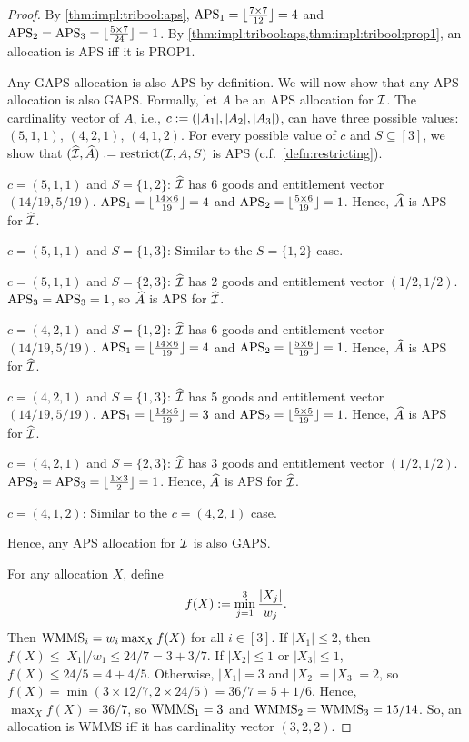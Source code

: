 \begin{proof}
By \cref{thm:impl:tribool:aps}, $\mathrm{APS}_1 = \lfloor \frac{7 \times 7}{12} \rfloor = 4$
and $\mathrm{APS}_2 = \mathrm{APS}_3 = \lfloor \frac{5 \times 7}{24} \rfloor = 1$.
By \cref{thm:impl:tribool:aps,thm:impl:tribool:prop1},
an allocation is APS iff it is PROP1.

Any GAPS allocation is also APS by definition.
We will now show that any APS allocation is also GAPS.
Formally, let $A$ be an APS allocation for $\mathcal{I}$.
The cardinality vector of $A$, i.e., $c := (|A_1|, |A_2|, |A_3|)$,
can have three possible values: $(5, 1, 1)$, $(4, 2, 1)$, $(4, 1, 2)$.
For every possible value of $c$ and $S \subseteq [3]$,
we show that $(\widehat{\mathcal{I}}, \widehat{A}) := \operatorname{restrict}(\mathcal{I}, A, S)$ is APS
(c.f.~\cref{defn:restricting}).
\begin{tightenum}
\item $c = (5, 1, 1)$ and $S = \{1, 2\}$:
    $\widehat{\mathcal{I}}$ has 6 goods and entitlement vector $(14/19, 5/19)$.
    $\mathrm{APS}_1 = \lfloor \frac{14 \times 6}{19} \rfloor = 4$ and $\mathrm{APS}_2 = \lfloor \frac{5 \times 6}{19} \rfloor = 1$.
    Hence, $\widehat{A}$ is APS for $\widehat{\mathcal{I}}$.
\item $c = (5, 1, 1)$ and $S = \{1, 3\}$:
    Similar to the $S = \{1, 2\}$ case.
\item $c = (5, 1, 1)$ and $S = \{2, 3\}$:
    $\widehat{\mathcal{I}}$ has 2 goods and entitlement vector $(1/2, 1/2)$.
    $\mathrm{APS}_3 = \mathrm{APS}_3 = 1$, so $\widehat{A}$ is APS for $\widehat{\mathcal{I}}$.
\item $c = (4, 2, 1)$ and $S = \{1, 2\}$:
    $\widehat{\mathcal{I}}$ has 6 goods and entitlement vector $(14/19, 5/19)$.
    $\mathrm{APS}_1 = \lfloor \frac{14 \times 6}{19} \rfloor = 4$ and $\mathrm{APS}_2 = \lfloor \frac{5 \times 6}{19} \rfloor = 1$.
    Hence, $\widehat{A}$ is APS for $\widehat{\mathcal{I}}$.
\item $c = (4, 2, 1)$ and $S = \{1, 3\}$:
    $\widehat{\mathcal{I}}$ has 5 goods and entitlement vector $(14/19, 5/19)$.
    $\mathrm{APS}_1 = \lfloor \frac{14 \times 5}{19} \rfloor = 3$ and $\mathrm{APS}_2 = \lfloor \frac{5 \times 5}{19} \rfloor = 1$.
    Hence, $\widehat{A}$ is APS for $\widehat{\mathcal{I}}$.
\item $c = (4, 2, 1)$ and $S = \{2, 3\}$:
    $\widehat{\mathcal{I}}$ has 3 goods and entitlement vector $(1/2, 1/2)$.
    $\mathrm{APS}_2 = \mathrm{APS}_3 = \lfloor \frac{1 \times 3}{2} \rfloor = 1$.
    Hence, $\widehat{A}$ is APS for $\widehat{\mathcal{I}}$.
\item $c = (4, 1, 2)$:
    Similar to the $c = (4, 2, 1)$ case.
\end{tightenum}
Hence, any APS allocation for $\mathcal{I}$ is also GAPS.

For any allocation $X$, define
\[ f(X) := \min_{j=1}^3 \frac{|X_j|}{w_j}. \]
Then $\mathrm{WMMS}_i = w_i\max_X f(X)$ for all $i \in [3]$.
If $|X_1| \le 2$, then $f(X) \le |X_1|/w_1 \le 24/7 = 3 + 3/7$.
If $|X_2| \le 1$ or $|X_3| \le 1$, $f(X) \le 24/5 = 4 + 4/5$.
Otherwise, $|X_1| = 3$ and $|X_2| = |X_3| = 2$,
so $f(X) = \min(3 \times 12/7, 2 \times 24/5) = 36/7 = 5 + 1/6$.
Hence, $\max_X f(X) = 36/7$, so $\mathrm{WMMS}_1 = 3$ and $\mathrm{WMMS}_2 = \mathrm{WMMS}_3 = 15/14$.
So, an allocation is WMMS iff it has cardinality vector $(3, 2, 2)$.


\end{proof}
